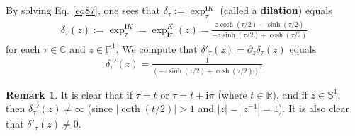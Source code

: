 \documentclass[12pt,b5paper,notitlepage]{article}
\theoremstyle{definition}
\newtheorem{rem}[df]{Remark}
\theoremstyle{plain}
\newcommand{\im}{\mathbf{i}}
\newcommand{\Cbb}{\mathbb C}
\newcommand{\Pbb}{\mathbb P}
\newcommand{\Rbb}{\mathbb R}
\newcommand{\Sbb}{{\mathbb S}}
\numberwithin{equation}{section}
\begin{document}
\subsection{}



By solving Eq. \eqref{eq87}, one sees that $\delta_\tau:=\exp^{\im K}_\tau$ (called a \textbf{dilation}) equals 
\begin{align}\label{eqb21}
\delta_\tau(z):=\exp^{\im K}_\tau=\exp^K_{\im\tau}(z)=\frac{z\cosh(\tau/2)-\sinh(\tau/2)}{-z\sinh(\tau/2)+\cosh(\tau/2)}
\end{align}
for each $\tau\in\Cbb$ and $z\in\Pbb^1$. We compute that $\delta'_\tau(z)=\partial_z\delta_\tau(z)$ equals
\begin{align}\label{eqb25}
\delta_\tau'(z)=\frac 1{(-z\sinh(\tau/2)+\cosh(\tau/2))^2}
\end{align}

\begin{rem}
It is clear that if  $\tau=t$ or $\tau=t+\im\pi$ (where $t\in\Rbb$), and if $z\in\Sbb^1$, then $\delta_\tau'(z)\neq \infty$ (since $|\coth(t/2)|>1$ and $|z|=|z^{-1}|=1$). It is also clear that $\delta'_\tau(z)\neq0$.
\end{rem}
\end{document}
